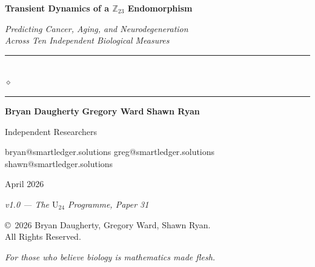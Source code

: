 \documentclass[11pt,a4paper]{article}
\begin{document}
\thispagestyle{empty}
\begin{center}
\vspace*{3cm}

{\fontsize{26}{32}\selectfont\bfseries\color{navydark}
Transient Dynamics of a $\mathbb{Z}_{23}$ Endomorphism}

\vspace{0.6cm}

{\fontsize{16}{20}\selectfont\color{navylight}\itshape
Predicting Cancer, Aging, and Neurodegeneration \\[4pt]
Across Ten Independent Biological Measures}

\vspace{1.2cm}

\textcolor{goldaccent}{\rule{6cm}{0.5pt}}\\[6pt]
{\large\color{goldaccent}$\diamond$}\\[6pt]
\textcolor{goldaccent}{\rule{6cm}{0.5pt}}

\vspace{1.2cm}

{\large
\textbf{Bryan Daugherty} \qquad \textbf{Gregory Ward} \qquad \textbf{Shawn Ryan}}

\vspace{0.3cm}

{\normalsize\color{navylight} Independent Researchers}

\vspace{0.2cm}

{\small\ttfamily
bryan@smartledger.solutions \quad greg@smartledger.solutions \quad shawn@smartledger.solutions}

\vspace{1.5cm}

{\large April 2026}

\vspace{0.3cm}

{\itshape\color{navylight} v1.0 --- The $\mathrm{U}_{24}$ Programme, Paper 31}

\vfill

{\small\color{navylight}
\copyright\ 2026 Bryan Daugherty, Gregory Ward, Shawn Ryan. \\
All Rights Reserved.}
\end{center}
\newpage

\thispagestyle{empty}
\vspace*{8cm}
\begin{center}
{\itshape\color{navylight}\large For those who believe biology is mathematics made flesh.}
\end{center}
\vfill
\newpage
\end{document}
